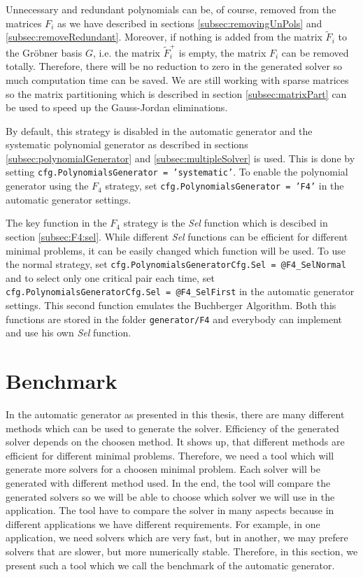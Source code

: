 Unnecessary and redundant polynomials can be, of course, removed from the matrices $F_i$ as we have described in sections \ref{subsec:removingUnPols} and \ref{subsec:removeRedundant}. Moreover, if nothing is added from the matrix $\tilde{F}_i$ to the Gr\"obner basis $G$, i.e. the matrix $\tilde{F}_i^+$ is empty, the matrix $F_i$ can be removed totally. Therefore, there will be no reduction to zero in the generated solver so much computation time can be saved. We are still working with sparse matrices so the matrix partitioning which is described in section \ref{subsec:matrixPart} can be used to speed up the Gauss-Jordan eliminations.

By default, this strategy is disabled in the automatic generator and the systematic polynomial generator as described in sections \ref{subsec:polynomialGenerator} and \ref{subsec:multipleSolver} is used. This is done by setting \texttt{cfg.PolynomialsGenerator = 'systematic'}. To enable the polynomial generator using the $F_4$ strategy, set \texttt{cfg.PolynomialsGenerator = 'F4'} in the automatic generator settings.

The key function in the $F_4$ strategy is the \textit{Sel} function which is descibed in section \ref{subsec:F4:sel}. While different \textit{Sel} functions can be efficient for different minimal problems, it can be easily changed which function will be used. To use the normal strategy, set \texttt{cfg.PolynomialsGeneratorCfg.Sel = @F4\_SelNormal} and to select only one critical pair each time, set \texttt{cfg.PolynomialsGeneratorCfg.Sel = @F4\_SelFirst} in the automatic generator settings. This second function emulates the Buchberger Algorithm. Both this functions are stored in the folder \texttt{generator/F4} and everybody can implement and use his own \textit{Sel} function.

\section{Benchmark}
In the automatic generator as presented in this thesis, there are many different methods which can be used to generate the solver. Efficiency of the generated solver depends on the choosen method. It shows up, that different methods are efficient for different minimal problems. Therefore, we need a tool which will generate more solvers for a choosen minimal problem. Each solver will be generated with different method used. In the end, the tool will compare the generated solvers so we will be able to choose which solver we will use in the application. The tool have to compare the solver in many aspects because in different applications we have different requirements. For example, in one application, we need solvers which are very fast, but in another, we may prefere solvers that are slower, but more numerically stable. Therefore, in this section, we present such a tool which we call the benchmark of the automatic generator.

